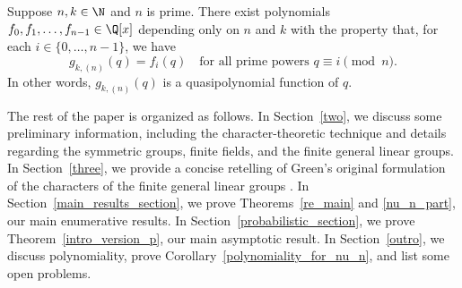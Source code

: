 \begin{corollary}
\label{polynomiality_for_nu_n}
Suppose \(n,k \in \N\) and \(n\) is prime.
There exist polynomials \(f_0, f_1, \ldots, f_{n-1} \in \Q[x]\) depending only on \(n\) and \(k\) with the property that, for each \(i \in \{0,\ldots,n-1\}\), we have
\begin{equation}
\label{its_a_quasipolynomial_yay}
g_{k,(n)}(q) = f_i(q) \quad \text{for all prime powers } q \equiv i \pmod n.
\end{equation}
In other words, \(g_{k,(n)} (q)\) is a quasipolynomial function of \(q\).
\end{corollary}






















The rest of the paper is organized as follows.
In Section~\ref{two}, we discuss some preliminary information, including the character-theoretic technique and details regarding the symmetric groups, finite fields, and the finite general linear groups.
In Section~\ref{three}, we provide a concise retelling of Green's original formulation of the characters of the finite general linear groups \cite{green}.
In Section~\ref{main_results_section}, we prove Theorems~\ref{re_main} and \ref{nu_n_part}, our main enumerative results.
In Section~\ref{probabilistic_section}, we prove Theorem~\ref{intro_version_p}, our main asymptotic result.
In Section~\ref{outro}, we discuss polynomiality, prove Corollary~\ref{polynomiality_for_nu_n}, and list some open problems.




































